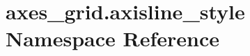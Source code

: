 \hypertarget{namespaceaxes__grid_1_1axisline__style}{}\section{axes\+\_\+grid.\+axisline\+\_\+style Namespace Reference}
\label{namespaceaxes__grid_1_1axisline__style}
